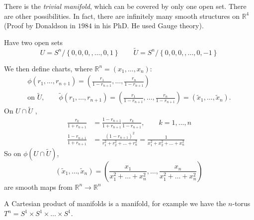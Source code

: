 \begin{example}[$M = \mathbb{R}^n$]
  There is the \emph{trivial manifold}, which can be covered by only one open set.
  There are other possibilities. In fact, there are infinitely many smooth structures on $\mathbb{R}^4$ (Proof by Donaldson in $1984$ in his PhD. He used Gauge theory).
\end{example}
\begin{example}[sphere $S^n = \left\{ \vb{r} \in \mathbb{R}^{n + 1}, \abs{\vb{r}} = 1 \right\}$ ]
  Have two open sets 
  \begin{equation}
    U = S^n / \left\{ 0,0,0,, \dots, 0, 1 \right\} \qquad
    \widetilde{U} = S^n / \left\{ 0,0,0,, \dots, 0, - 1 \right\}
  \end{equation}
  \begin{figure}[tbhp]
    \centering
    \def\svgwidth{0.4\columnwidth}
    
    \caption{}
    \label{fig:l1f5}
  \end{figure}
  We then define charts, where $\mathbb{R}^n = (x_1, \dots, x_n)$:
  \begin{equation}
    \begin{gathered}
      \phi(r_1, \dots, r_{n+1}) = \left( \frac{r_1}{1 - r_{n+1}}, \dots, \frac{r_n}{1-r_{n+1}} \right) \\
      \text{on } \widetilde{U}, \qquad \widetilde{\phi}(r_1, \dots, r_{n+1}) = \left( \frac{r_1}{1 - r_{n+1}}, \dots, \frac{r_n}{1-r_{n+1}} \right) = (\widetilde{x}_1 , \dots, \widetilde{x}_n).
    \end{gathered}
  \end{equation}
  On $U \cap \widetilde{U}$ , 
  \begin{align}
    \frac{r_k}{1 + r_{n+1}} &= \frac{1 - r_{n+1}}{1 + r_{n+1}} \frac{r_k}{1 - r_{n+1}}, \qquad k = 1, \dots, n \\
    \frac{1 - r_{n+1}}{1 + r_{n+1}} &= \frac{(1 - r_{n+1})^2}{r^2_1 + r^2_2 + \dots + r^2_n} = \frac{1}{x^2_1 + x^2_2 + \dots + x^2_n}
  \end{align}
  So on $\phi(U \cap \widetilde{U})$,
  \begin{equation}
    (\widetilde{x}_1, \dots, \widetilde{x}_n) = \left( \frac{x_1}{x^2_1 + \dots + x^2_n}, \dots, \frac{x_n}{x^2_1 + \dots + x^2_n} \right)
  \end{equation}
  are smooth maps from $\mathbb{R}^n \to \mathbb{R}^n$
\end{example}
\begin{example}[]
  A Cartesian product of manifolds is a manifold, for example we have the $n$-torus $T^n = S^1 \times S^1 \times \dots \times S^1$.
\end{example}
